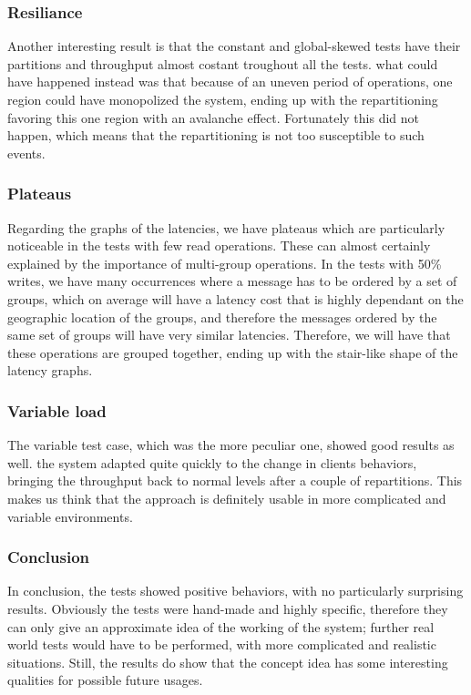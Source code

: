 \subsubsection{Resiliance}
Another interesting result is that the constant and global-skewed tests have their partitions and throughput almost costant troughout all the tests. what could have happened instead was that because of an uneven period of operations, one region could have monopolized the system, ending up with the repartitioning favoring this one region with an avalanche effect. Fortunately this did not happen, which means that the repartitioning is not too susceptible to such events.

\subsubsection{Plateaus}
Regarding the graphs of the latencies, we have plateaus which are particularly noticeable in the tests with few read operations. These can almost certainly explained by the importance of multi-group operations. In the tests with 50\% writes, we have many occurrences where a message has to be ordered by a set of groups, which on average will have a latency cost that is highly dependant on the geographic location of the groups, and therefore the messages ordered by the same set of groups will have very similar latencies. Therefore, we will have that these operations are grouped together, ending up with the stair-like shape of the latency graphs. 

\subsubsection{Variable load}
The variable test case, which was the more peculiar one, showed good results as well. the system adapted quite quickly to the change in clients behaviors, bringing the throughput back to normal levels after a couple of repartitions. This makes us think that the approach is definitely usable in more complicated and variable environments.

\subsubsection{Conclusion}
In conclusion, the tests showed positive behaviors, with no particularly surprising results. Obviously the tests were hand-made and highly specific, therefore they can only give an approximate idea of the working of the system; further real world tests would have to be performed, with more complicated and realistic situations. Still, the results do show that the concept idea has some interesting qualities for possible future usages.

